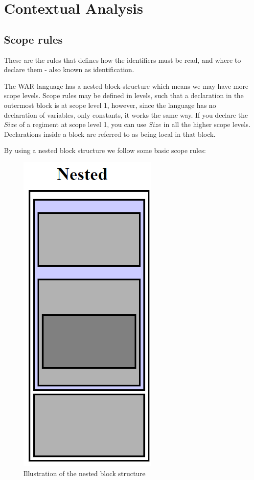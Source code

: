 \section{Contextual Analysis}

	\subsection{Scope rules}
	These are the rules that defines how the identifiers must be read, and where to declare them - also known as identification.
	
	
	The WAR language has a nested block-structure which means we may have more scope levels. Scope rules may be defined in levels, such that a declaration in the outermost block is at scope level 1, however, since the language has no declaration of variables, only constants, it works the same way. If you declare the $Size$ of a regiment at scope level 1, you can use $Size$ in all the higher scope levels. Declarations inside a block are referred to as being local in that block.
		\newpage

	By using a nested block structure we follow some basic scope rules:
	\begin{figure}
		\begin{center}
			\includegraphics[scale=1]{rapport/5/figures/nested_block_structure}
		\end{center}	
		\caption{Illustration of the nested block structure}
		\label{nested_block_structure}
	\end{figure}


